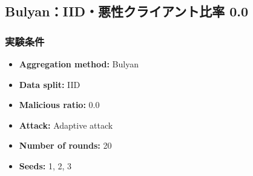 \documentclass[a4j,twocolumn,dvipdfmx]{jsarticle}
\begin{document}
\subsection{Bulyan：IID・悪性クライアント比率 0.0}

\subsubsection{実験条件}

\begin{itemize}
    \item \textbf{Aggregation method:} Bulyan
    \item \textbf{Data split:} IID
    \item \textbf{Malicious ratio:} 0.0
    \item \textbf{Attack:} Adaptive attack
    \item \textbf{Number of rounds:} 20
    \item \textbf{Seeds:} 1, 2, 3
\end{itemize}

\end{document}
